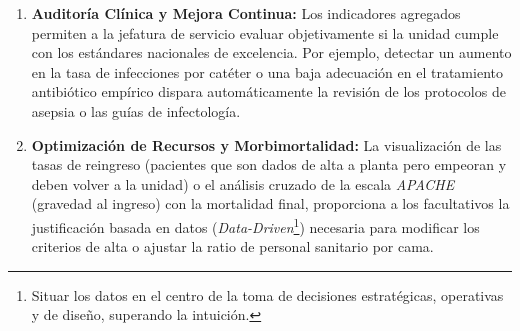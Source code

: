 \begin{enumerate}
    \item \textbf{Auditoría Clínica y Mejora Continua:} Los indicadores agregados permiten a la jefatura de servicio evaluar objetivamente si la unidad cumple con los estándares nacionales de excelencia. Por ejemplo, detectar un aumento en la tasa de infecciones por catéter o una baja adecuación en el tratamiento antibiótico empírico dispara automáticamente la revisión de los protocolos de asepsia o las guías de infectología.
    \item \textbf{Optimización de Recursos y Morbimortalidad:} La visualización de las tasas de reingreso (pacientes que son dados de alta a planta pero empeoran y deben volver a la unidad) o el análisis cruzado de la escala \textit{APACHE} (gravedad al ingreso) con la mortalidad final, proporciona a los facultativos la justificación basada en datos (\textit{Data-Driven}\footnote{Situar los datos en el centro de la toma de decisiones estratégicas, operativas y de diseño, superando la intuición.}) necesaria para modificar los criterios de alta o ajustar la ratio de personal sanitario por cama.
\end{enumerate}